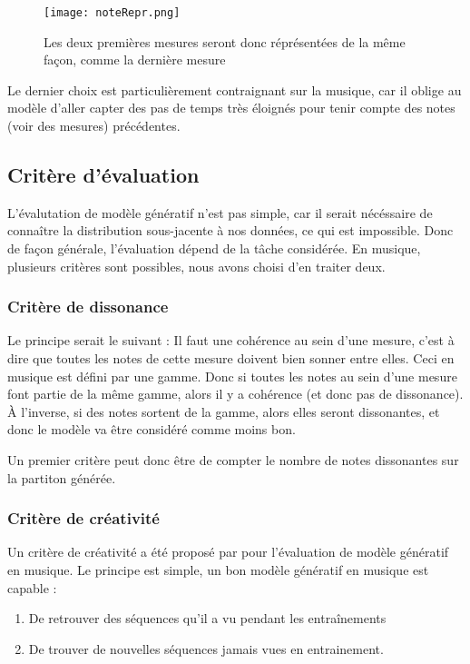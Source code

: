 \documentclass[a4paper]{article}
\begin{document}
\begin{figure}[ht]
  \caption{Les deux premières mesures seront donc réprésentées de la même façon, comme la dernière mesure}
  \texttt{[image: noteRepr.png]}
  \label{fig:noteRepr}
\end{figure}

Le dernier choix est particulièrement contraignant sur la musique, car il oblige au modèle d'aller capter des pas de temps très éloignés pour tenir compte des notes (voir des mesures) précédentes.

\subsection{Critère d'évaluation}

L'évalutation de modèle génératif n'est pas simple, car il serait nécéssaire de connaître la distribution sous-jacente à nos données, ce qui est impossible. Donc de façon générale, l'évaluation dépend de la tâche considérée. En musique, plusieurs critères sont possibles, nous avons choisi d'en traiter deux.

\subsubsection{Critère de dissonance}

Le principe serait le suivant : Il faut une cohérence au sein d'une mesure, c'est à dire que toutes les notes de cette mesure doivent bien sonner entre elles. Ceci en musique est défini par une gamme. Donc si toutes les notes au sein d'une mesure font partie de la même gamme, alors il y a cohérence (et donc pas de dissonance). À l'inverse, si des notes sortent de la gamme, alors elles seront dissonantes, et donc le modèle va être considéré comme moins bon.

Un premier critère peut donc être de compter le nombre de notes dissonantes sur la partiton générée.


\subsubsection{Critère de créativité}

Un critère de créativité a été proposé par \cite{hadj16} pour l'évaluation de modèle génératif en musique. Le principe est simple, un bon modèle génératif en musique est capable :

\begin{enumerate}
\item De retrouver des séquences qu'il a vu pendant les entraînements
\item De trouver de nouvelles séquences jamais vues en entrainement.
\end{enumerate}
\end{document}
